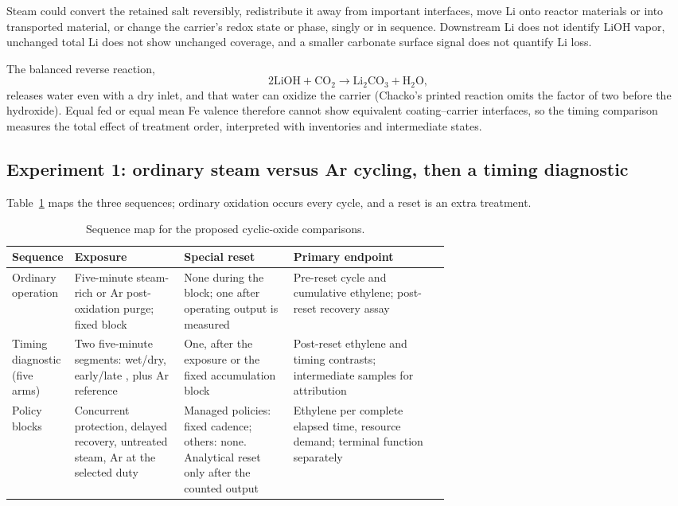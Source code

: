 Steam could convert the retained salt reversibly, redistribute it away from important interfaces, move Li onto reactor materials or into transported material, or change the carrier's redox state or phase, singly or in sequence. Downstream Li does not identify LiOH vapor, unchanged total Li does not show unchanged coverage, and a smaller carbonate surface signal does not quantify Li loss.

The balanced reverse reaction,
\begin{equation}
 \mathrm{2LiOH+CO_2\longrightarrow Li_2CO_3+H_2O},
 \label{eq:cyclic-carbonation}
\end{equation}
releases water even with a dry inlet, and that water can oxidize the carrier\cite[ch.~4.1]{chacko2025thesis} (Chacko's printed reaction omits the factor of two before the hydroxide). Equal fed \COtwo{} or equal mean Fe valence therefore cannot show equivalent coating--carrier interfaces, so the timing comparison measures the total effect of treatment order, interpreted with inventories and intermediate states.

\subsection{Experiment 1: ordinary steam versus Ar cycling, then a timing diagnostic}

Table~\ref{tab:cyclic-sequences} maps the three sequences; ordinary oxidation occurs every cycle, and a reset is an extra treatment.

\begin{table}[htbp]
\centering
\small
\caption{Sequence map for the proposed cyclic-oxide comparisons.}
\label{tab:cyclic-sequences}
\begin{tabularx}{\linewidth}{@{}>{\raggedright\arraybackslash}p{0.14\linewidth}>{\raggedright\arraybackslash}p{0.25\linewidth}>{\raggedright\arraybackslash}p{0.25\linewidth}>{\raggedright\arraybackslash}X@{}}
\toprule
Sequence & Exposure & Special reset & Primary endpoint\\
\midrule
Ordinary operation & Five-minute steam-rich or Ar post-oxidation purge; fixed block & None during the block; one after operating output is measured & Pre-reset cycle and cumulative ethylene; post-reset recovery assay\\
Timing diagnostic (five arms) & Two five-minute segments: wet/dry, early/late \COtwo{}, plus Ar reference & One, after the exposure or the fixed accumulation block & Post-reset ethylene and timing contrasts; intermediate samples for attribution\\
Policy blocks & Concurrent protection, delayed recovery, untreated steam, Ar at the selected duty & Managed policies: fixed cadence; others: none. Analytical reset only after the counted output & Ethylene per complete elapsed time, resource demand; terminal function separately\\
\bottomrule
\end{tabularx}
\end{table}

